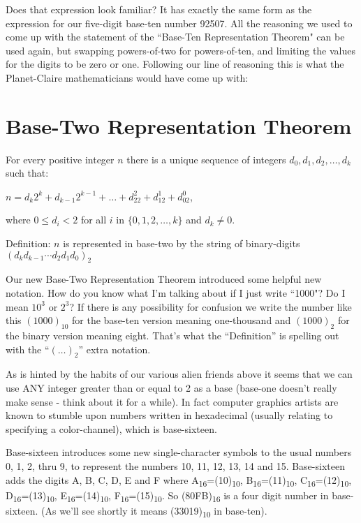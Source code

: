 \documentclass{article}
\newenvironment{jprIn}{\begin{adjustwidth}{2em}{}}{\end{adjustwidth}}
\begin{document}
Does that expression look familiar? It has exactly the same form
as the expression for our five-digit base-ten number 92507.
All the reasoning we used to come up with the statement of the ``Base-Ten
Representation Theorem" can be used again, but swapping powers-of-two
for powers-of-ten, and limiting the values for the digits
to be zero or one.
Following our line of reasoning this is what the Planet-Claire mathematicians would have
come up with:

\section*{Base-Two Representation Theorem}
\begin{jprIn}
For every positive integer $n$ there is a unique
sequence of integers $d_0, d_1, d_2,\dots{},d_k$ such that:

\hspace{3em}$n=d_k2^k+d_{k-1}2^{k-1}+\dots+d_22^2+d_12^1+d_02^0$,

where $0\le{}d_i<2$ for all $i$ in $\{0,1,2,\dots{},k\}$ and $d_k\ne0$.

Definition: $n$ is represented in base-two by the string
of binary-digits $(d_kd_{k-1}{\cdots}d_2d_1d_0)_2$
\end{jprIn}
\bigskip

Our new Base-Two Representation Theorem introduced some helpful new notation.
How do you know what I'm talking about if I just
write ``1000"? Do I mean $10^3$ or $2^3$?
If there is any possibility for confusion we write
the number like this $(1000)_{10}$ 
for the base-ten version meaning one-thousand and $(1000)_2$
for the binary version meaning eight.
That's what the ``Definition'' is spelling out with the ``$(\dots)_2$'' extra notation.

As is hinted by the habits of our various alien friends
above it seems that we can use ANY integer greater than
or equal to 2 as a base (base-one doesn't really make
sense - think about it for a while).
In fact computer graphics artists are known
to stumble upon numbers written in hexadecimal (usually relating to specifying a color-channel),
which is base-sixteen.

Base-sixteen introduces some new single-character symbols to the usual numbers 0, 1,
2, thru 9,
to represent the numbers 10, 11, 12, 13, 14 and 15.
Base-sixteen adds the digits A, B, C, D, E and F where
A\textsubscript{16}=(10)\textsubscript{10},
B\textsubscript{16}=(11)\textsubscript{10},
C\textsubscript{16}=(12)\textsubscript{10},
D\textsubscript{16}=(13)\textsubscript{10},
E\textsubscript{16}=(14)\textsubscript{10},
F\textsubscript{16}=(15)\textsubscript{10}.
So (80FB)\textsubscript{16} is a four digit number in base-sixteen.
(As we'll see shortly it means (33019)\textsubscript{10} in base-ten).
\end{document}
